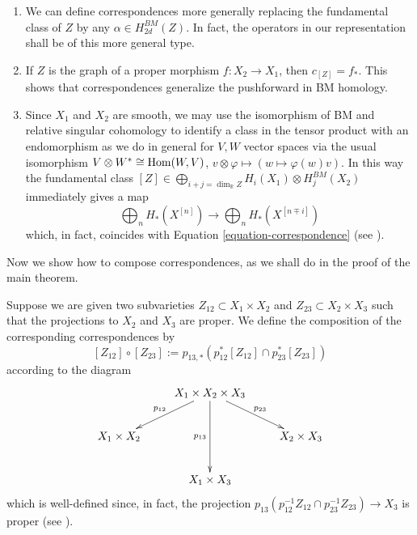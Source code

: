 \begin{remark}
\label{remark-notes}
\begin{enumerate}
\item 
\label{item-any-class}
We can define correspondences more generally
replacing the fundamental class of $Z$ 
by any $\alpha \in H_{2d}^{BM}(Z)$.
In fact, the operators in our representation
shall be of this more general type.

\item If $Z$ is the graph of a proper morphism
$f:X_2 \to X_1$, then $c_{[Z]}=f_*$.
This shows that correspondences generalize
the pushforward in BM homology.

\item Since $X_1$ and $X_2$ are smooth,
we may use the isomorphism of BM and relative singular cohomology
to identify a class in the tensor product with an endomorphism
as we do in general for $V,W$ vector spaces via the usual isomorphism
$V \otimes W^* \cong \mathop{\mathrm{Hom}}\nolimits(W,V)$, $v \otimes \varphi \mapsto 
(w \mapsto \varphi(w)v)$.
In this way the fundamental class 
$[Z] \in \bigoplus_{i+j=\dim_\mathbb{R}Z}H_i(X_1)\otimes H_j^{BM}(X_2)$
immediately gives a map
$$
\bigoplus_{n}H_* (X^{[n]}) \to \bigoplus_{n}H_* (X^{[n\mp i]})
$$
which, in fact, coincides with Equation \ref{equation-correspondence}
(see \cite[Section 8.3]{Nakajima-lectures}).

\end{enumerate}
\end{remark}

\medskip\noindent
Now we show how to compose correspondences,
as we shall do in the proof of the main theorem.

Suppose we are given two subvarieties
$Z_{12} \subset X_1 \times X_2$ and $Z_{23} \subset X_2 \times X_3$
such that the projections to $X_2$ and $X_3$ are proper.
We define the composition of the corresponding correspondences by
\begin{equation}
\label{equation-composition}
[Z_{12}]\circ[Z_{23}]:=p_{13,*}(p_{12}^* [Z_{12}]\cap p_{23}^* [Z_{23}])
\end{equation}
according to the diagram
$$
\xymatrix{
&  X_1 \times X_2 \times X_3\ar[dl]_{p_{12}}\ar[dr]^{p_{23}}\ar[dd]_{p_{13}}\\
 X_1\times X_2& & X_2\times X_3\\
& X_1\times X_3
}
$$
which is well-defined since, in fact,
the projection $p_{13}(p_{12}^{-1}Z_{12} \cap p_{23}^{-1} Z_{23})\to X_3$ 
is proper (see \cite[Section 8.3]{Nakajima-lectures}).




